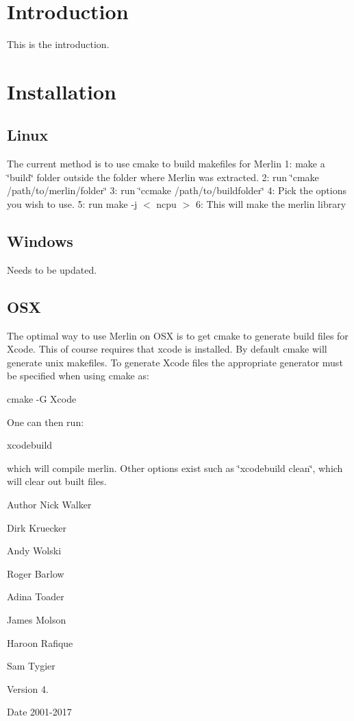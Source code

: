 \hypertarget{index_intro_sec}{}\section{Introduction}\label{index_intro_sec}
This is the introduction.\hypertarget{index_install_sec}{}\section{Installation}\label{index_install_sec}
\hypertarget{index_Linux}{}\subsection{Linux}\label{index_Linux}
The current method is to use cmake to build makefiles for Merlin 1\+: make a \char`\"{}build\char`\"{} folder outside the folder where Merlin was extracted. 2\+: run \char`\"{}cmake /path/to/merlin/folder\char`\"{} 3\+: run \char`\"{}ccmake /path/to/buildfolder\char`\"{} 4\+: Pick the options you wish to use. 5\+: run make -\/j $<$ ncpu $>$ 6\+: This will make the merlin library\hypertarget{index_Windows}{}\subsection{Windows}\label{index_Windows}
Needs to be updated. \hypertarget{index_OSX}{}\subsection{O\+SX}\label{index_OSX}
The optimal way to use Merlin on O\+SX is to get cmake to generate build files for Xcode. This of course requires that xcode is installed. By default cmake will generate unix makefiles. To generate Xcode files the appropriate generator must be specified when using cmake as\+:

cmake -\/G Xcode

One can then run\+:

xcodebuild

which will compile merlin. Other options exist such as \char`\"{}xcodebuild clean\char`\"{}, which will clear out built files.

\begin{DoxyAuthor}{Author}
Nick Walker 

Dirk Kruecker 

Andy Wolski 

Roger Barlow 

Adina Toader 

James Molson 

Haroon Rafique 

Sam Tygier 
\end{DoxyAuthor}
\begin{DoxyVersion}{Version}
4. 
\end{DoxyVersion}
\begin{DoxyDate}{Date}
2001-\/2017 
\end{DoxyDate}
